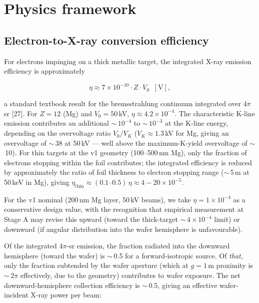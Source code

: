 \documentclass[11pt,letterpaper]{article}
\begin{document}
\section{Physics framework}

\subsection{Electron-to-X-ray conversion efficiency}

For electrons impinging on a thick metallic target, the integrated X-ray emission efficiency is approximately

\begin{equation}
\eta \approx 7 \times 10^{-10} \cdot Z \cdot V_0 \;\;[\text{V}],
\end{equation}

a standard textbook result for the bremsstrahlung continuum integrated over $4\pi$\,sr [27]. For $Z = 12$ (Mg) and $V_0 = 50$\,kV, $\eta \approx 4.2 \times 10^{-4}$. The characteristic K-line emission contributes an additional $\sim$\,$10^{-4}$ to $\sim$\,$10^{-3}$ at the K-line energy, depending on the overvoltage ratio $V_0 / V_K$ ($V_K \approx 1.3$\,kV for Mg, giving an overvoltage of $\sim$\,38 at 50\,kV --- well above the maximum-K-yield overvoltage of $\sim$\,10). For thin targets at the v1 geometry (100--500\,nm Mg), only the fraction of electrons stopping within the foil contributes; the integrated efficiency is reduced by approximately the ratio of foil thickness to electron stopping range ($\sim$\,5\,\textmu m at 50\,keV in Mg), giving $\eta_\text{thin} \approx (0.1\text{--}0.5)\,\eta \approx 4{-}20 \times 10^{-5}$.

For the v1 nominal (200\,nm Mg layer, 50\,kV beams), we take \textbf{$\eta = 1 \times 10^{-4}$} as a conservative design value, with the recognition that empirical measurement at Stage A may revise this upward (toward the thick-target $\sim$\,$4 \times 10^{-4}$ limit) or downward (if angular distribution into the wafer hemisphere is unfavourable).

Of the integrated $4\pi$-sr emission, the fraction radiated into the downward hemisphere (toward the wafer) is $\sim$\,0.5 for a forward-isotropic source. Of \textit{that}, only the fraction subtended by the wafer aperture (which at $g = 1$\,\textmu m proximity is $\sim$\,$2\pi$ effectively, due to the geometry) contributes to wafer exposure. The net downward-hemisphere collection efficiency is $\sim$\,0.5, giving an effective wafer-incident X-ray power per beam:
\end{document}
